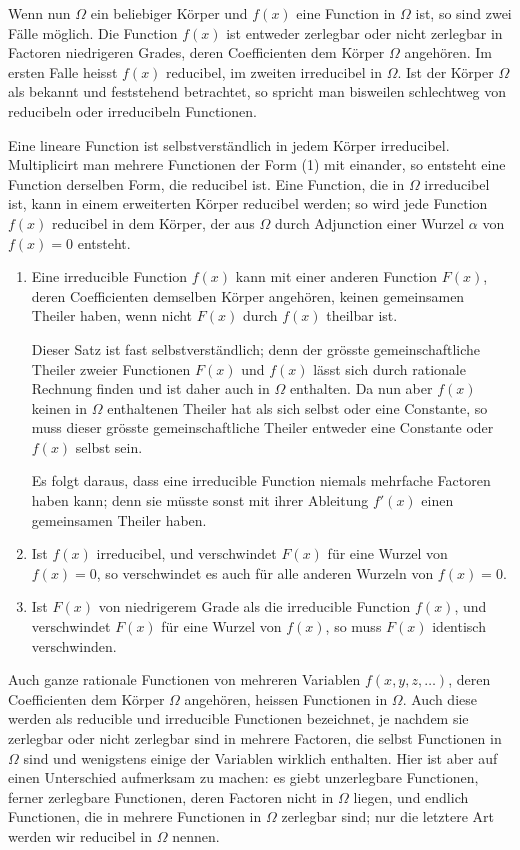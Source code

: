 \documentclass[11pt]{article}
\begin{document}
Wenn nun $\Omega$ ein beliebiger Körper und $f(x)$ eine Function in $\Omega$ ist, so sind zwei Fälle möglich. Die Function $f(x)$ ist entweder zerlegbar oder nicht zerlegbar in Factoren niedrigeren Grades, deren Coefficienten dem Körper $\Omega$ angehören. Im ersten Falle heisst $f(x)$ reducibel, im zweiten irreducibel in $\Omega$. Ist der Körper $\Omega$ als bekannt und feststehend betrachtet, so spricht man bisweilen schlechtweg von reducibeln oder irreducibeln Functionen.

Eine lineare Function ist selbstverständlich in jedem Körper irreducibel. Multiplicirt man mehrere Functionen der Form (1) mit einander, so entsteht eine Function derselben Form, die reducibel ist. Eine Function, die in $\Omega$ irreducibel ist, kann in einem erweiterten Körper reducibel werden; so wird jede Function $f(x)$ reducibel in dem Körper, der aus $\Omega$ durch Adjunction einer Wurzel $\alpha$ von $f(x)=0$ entsteht.

\begin{enumerate}[label=\Roman*.,leftmargin=2.8em]
\item Eine irreducible Function $f(x)$ kann mit einer anderen Function $F(x)$, deren Coefficienten demselben Körper angehören, keinen gemeinsamen Theiler haben, wenn nicht $F(x)$ durch $f(x)$ theilbar ist.

Dieser Satz ist fast selbstverständlich; denn der grösste gemeinschaftliche Theiler zweier Functionen $F(x)$ und $f(x)$ lässt sich durch rationale Rechnung finden und ist daher auch in $\Omega$ enthalten. Da nun aber $f(x)$ keinen in $\Omega$ enthaltenen Theiler hat als sich selbst oder eine Constante, so muss dieser grösste gemeinschaftliche Theiler entweder eine Constante oder $f(x)$ selbst sein.

Es folgt daraus, dass eine irreducible Function niemals mehrfache Factoren haben kann; denn sie müsste sonst mit ihrer Ableitung $f'(x)$ einen gemeinsamen Theiler haben.

\item Ist $f(x)$ irreducibel, und verschwindet $F(x)$ für eine Wurzel von $f(x)=0$, so verschwindet es auch für alle anderen Wurzeln von $f(x)=0$.

\item Ist $F(x)$ von niedrigerem Grade als die irreducible Function $f(x)$, und verschwindet $F(x)$ für eine Wurzel von $f(x)$, so muss $F(x)$ identisch verschwinden.
\end{enumerate}

Auch ganze rationale Functionen von mehreren Variablen $f(x,y,z,\ldots)$, deren Coefficienten dem Körper $\Omega$ angehören, heissen Functionen in $\Omega$. Auch diese werden als reducible und irreducible Functionen bezeichnet, je nachdem sie zerlegbar oder nicht zerlegbar sind in mehrere Factoren, die selbst Functionen in $\Omega$ sind und wenigstens einige der Variablen wirklich enthalten. Hier ist aber auf einen Unterschied aufmerksam zu machen: es giebt unzerlegbare Functionen, ferner zerlegbare Functionen, deren Factoren nicht in $\Omega$ liegen, und endlich Functionen, die in mehrere Functionen in $\Omega$ zerlegbar sind; nur die letztere Art werden wir reducibel in $\Omega$ nennen.
\end{document}
